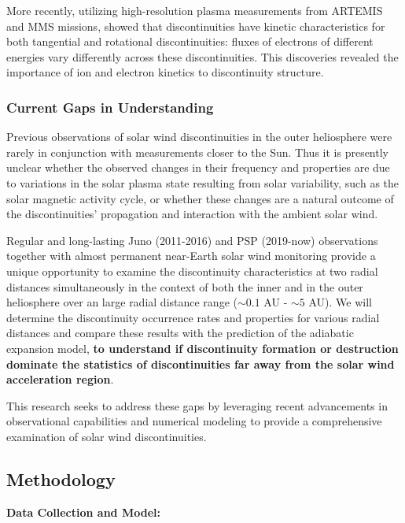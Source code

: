 \documentclass[
  letterpaper,
  DIV=11,
  numbers=noendperiod]{scrartcl}
\begin{document}
More recently, utilizing high-resolution plasma measurements from ARTEMIS and MMS missions, \citet{artemyevKineticNatureSolar2019} showed that discontinuities have kinetic characteristics for both tangential and rotational discontinuities: fluxes of electrons of different energies vary differently across these discontinuities. This discoveries revealed the importance of ion and electron kinetics to discontinuity structure.

\subsubsection{Current Gaps in Understanding}\label{current-gaps-in-understanding}

Previous observations of solar wind discontinuities in the outer heliosphere were rarely in conjunction with measurements closer to the Sun. Thus it is presently unclear whether the observed changes in their frequency and properties are due to variations in the solar plasma state resulting from solar variability, such as the solar magnetic activity cycle, or whether these changes are a natural outcome of the discontinuities' propagation and interaction with the ambient solar wind.

Regular and long-lasting Juno (2011-2016) and PSP (2019-now) observations together with almost permanent near-Earth solar wind monitoring provide a unique opportunity to examine the discontinuity characteristics at two radial distances simultaneously in the context of both the inner and in the outer heliosphere over an large radial distance range (\(\sim 0.1\) AU - \(\sim 5\) AU). We will determine the discontinuity occurrence rates and properties for various radial distances and compare these results with the prediction of the adiabatic expansion model, \textbf{to understand if discontinuity formation or destruction dominate the statistics of discontinuities far away from the solar wind acceleration region}.

This research seeks to address these gaps by leveraging recent advancements in observational capabilities and numerical modeling to provide a comprehensive examination of solar wind discontinuities.

\subsection{Methodology}\label{methodology}

\textbf{Data Collection and Model:}
\end{document}
